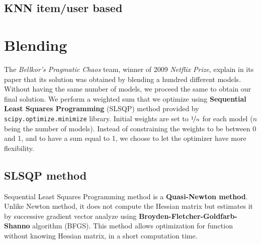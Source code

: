 \documentclass[10pt,conference,compsocconf]{IEEEtran}
\begin{document}
\subsection{KNN item/user based}


\section{Blending}
\label{sec:blending}

The \textit{Bellkor's Pragmatic Chaos} team, winner of 2009 \textit{Netflix Prize}, explain in its paper that its solution was obtained by blending a hundred different models. \cite{BellKore_netflix} Without having the same number of models, we proceed the same to obtain our final solution. We perform a weighted sum that we optimize using \textbf{Sequential Least Squares Programming} (SLSQP) method provided by \texttt{scipy.optimize.minimize} library. Initial weights are set to $\nicefrac{1}{n}$ for each model ($n$ being the number of models). Instead of constraining the weights to be between 0 and 1, and to have a sum equal to 1, we choose to let the optimizer have more flexibility.

\subsection{SLSQP method}
\label{SLSQP}
Sequential Least Squares Programming method is a \textbf{Quasi-Newton method}. Unlike Newton method, it does not compute the Hessian matrix but estimates it by successive gradient vector analyze \cite{wiki:quasi_newton} using \textbf{Broyden-Fletcher-Goldfarb-Shanno} algorithm (BFGS). This method allows optimization for function without knowing Hessian matrix, in a short computation time.
\end{document}
